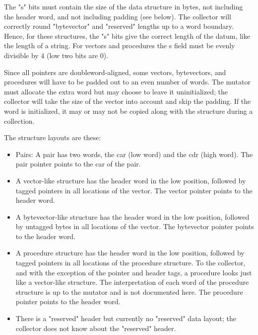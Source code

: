 The "s" bits must contain the size of the data structure in bytes, not
including the header word, and not including padding (see below). The
collector will correctly round "bytevector" and "reserved" lengths up
to a word boundary. Hence, for these structures, the "s" bits give the
correct length of the datum, like the length of a string. For vectors
and procedures the s field must be evenly divisible by 4 (low two bits
are 0).

Since all pointers are doubleword-aligned, some vectors, bytevectors,
and procedures will have to be padded out to an even number of words.
The mutator must allocate the extra word but may choose to leave it
uninitialized; the collector will take the size of the vector into
account and skip the padding. If the word is initialized, it may or
may not be copied along with the structure during a collection.

The structure layouts are these:

\begin{itemize}
\item
Pairs: A pair has two words, the car (low word) and the cdr (high word).
The pair pointer points to the car of the pair.

\item
A vector-like structure has the header word in the low position, followed
by tagged pointers in all locations of the vector. The vector pointer
points to the header word.

\item
A bytevector-like structure has the header word in the low position,
followed by untagged bytes in all locations of the vector. The bytevector
pointer points to the header word.

\item
A procedure structure has the header word in the low position, followed by
tagged pointers in all locations of the procedure structure. To the
collector, and with the exception of the pointer and header tags, a
procedure looks just like a vector-like structure. The interpretation of
each word of the procedure structure is up to the mutator and is not
documented here. The procedure pointer points to the header word.

\item
There is a "reserved" header but currently no "reserved" data layout; the
collector does not know about the "reserved" header.
\end{itemize}


